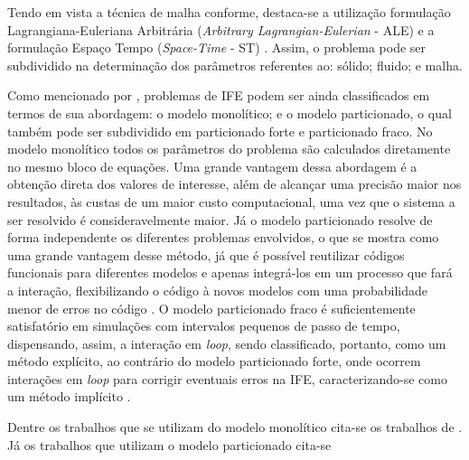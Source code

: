 Tendo em vista a técnica de malha conforme, destaca-se a utilização formulação Lagrangiana-Euleriana Arbitrária (\textit{Arbitrary Lagrangian-Eulerian} - ALE) \cite{donea1982arbitrary,kanchi20073d,fernandes2019ale} e a formulação Espaço Tempo (\textit{Space-Time} - ST) \cite{takizawa2011multiscale,terahara2020heart,takizawa2011stabilized}. Assim, o problema pode ser subdividido na determinação dos parâmetros referentes ao: sólido; fluido; e malha.

Como mencionado por , problemas de IFE podem ser ainda classificados em termos de sua abordagem: o modelo monolítico; e o modelo particionado, o qual também pode ser subdividido em particionado forte e particionado fraco. No modelo monolítico todos os parâmetros do problema são calculados diretamente no mesmo bloco de equações. Uma grande vantagem dessa abordagem é a obtenção direta dos valores de interesse, além de alcançar uma precisão maior nos resultados, às custas de um maior custo computacional, uma vez que o sistema a ser resolvido é consideravelmente maior. Já o modelo particionado resolve de forma independente os diferentes problemas envolvidos, o que se mostra como uma grande vantagem desse método, já que é possível reutilizar códigos funcionais para diferentes modelos e apenas integrá-los em um processo que fará a interação, flexibilizando o código à novos modelos com uma probabilidade menor de erros no código \cite{roux2008domain,hou2012numerical}. O modelo particionado fraco é suficientemente satisfatório em simulações com intervalos pequenos de passo de tempo, dispensando, assim, a interação em \textit{loop}, sendo classificado, portanto, como um método explícito, ao contrário do modelo particionado forte, onde ocorrem interações em \textit{loop} para corrigir eventuais erros na IFE, caracterizando-se como um método implícito \cite{fernandes2020tecnica}.

Dentre os trabalhos que se utilizam do modelo monolítico cita-se os trabalhos de . Já os trabalhos que utilizam o modelo particionado cita-se 